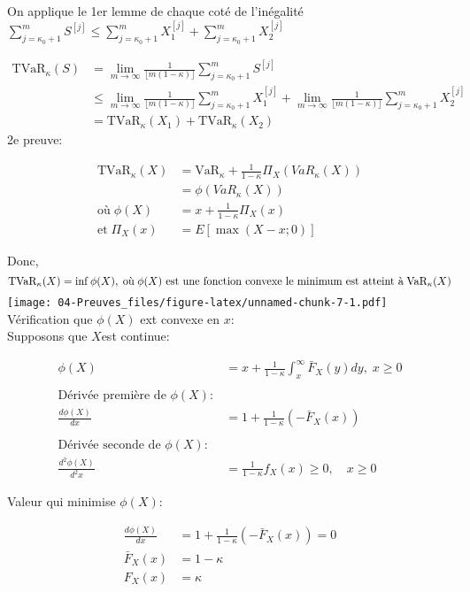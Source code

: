 \documentclass[]{book}
\theoremstyle{definition}
\theoremstyle{definition}
\theoremstyle{definition}
\theoremstyle{remark}
\begin{document}
On applique le 1er lemme de chaque coté de l'inégalité\\
\(\sum^m_{j=\kappa_0 +1} S^{[j]}\le\sum^m_{j=\kappa_0 +1} X_1^{[j]}+\sum^m_{j=\kappa_0 +1} X_2^{[j]}\)

\begin{align*}
\text{TVaR}_\kappa(S)& = \lim_{m\to\infty}\frac{1}{\lfloor m(1-\kappa)\rfloor} \sum^m_{j=\kappa_0 +1} S^{[j]}\\
& \le \lim_{m\to\infty}\frac{1}{\lfloor m(1-\kappa)\rfloor} \sum^m_{j=\kappa_0 +1} X_1^{[j]} + \lim_{m\to\infty}\frac{1}{\lfloor m(1-\kappa)\rfloor} \sum^m_{j=\kappa_0 +1} X_2^{[j]}\\
& =\text{TVaR}_\kappa(X_1)+\text{TVaR}_\kappa(X_2)
\end{align*}
 2e preuve:

\begin{align*}
\text{TVaR}_\kappa(X)& =\text{VaR}_\kappa+\frac{1}{1-\kappa}\Pi_X(VaR_\kappa(X))\\
& =\phi(VaR_\kappa(X))\\
\text{où}\;\phi(X)& =x + \frac{1}{1-\kappa}\Pi_X(x)\\
\text{et}\; \Pi_X(x)& = E\left[\max(X-x;0)\right]
\end{align*}

Donc, \[
\text{TVaR}_\kappa(X)= \inf \phi(X),\; \text{où}\;\phi(X) \text{ est une fonction convexe}   
\\
\text{ le minimum est atteint à}\; \text{VaR}_\kappa(X)
\] \texttt{[image: 04-Preuves\_files/figure-latex/unnamed-chunk-7-1.pdf]}
Vérification que \(\phi(X)\) ext convexe en \(x\):\\
Supposons que \(X\)est continue:

\begin{align*}
\phi(X)& =x + \frac{1}{1-\kappa} \int^{\infty}_x \bar{F}_X(y)dy,\;x\geq 0\\
\\
\text{Dérivée première de }\phi(X):\\
\frac{d\phi(X)}{dx}& =1+\frac{1}{1-\kappa}(-\bar{F}_X(x))\\
\\
\text{Dérivée seconde de }\phi(X):\\
\frac{d^2\phi(X)}{d^2x}& =\frac{1}{1-\kappa}f_X(x)\geq 0,\quad x\geq 0
\end{align*}

Valeur qui minimise \(\phi(X)\):

\begin{align*}
\frac{d\phi(X)}{dx}& = 1+\frac{1}{1-\kappa}(-\bar{F}_X(x))=0\\
\bar{F}_X(x)& =1-\kappa\\
F_X(x)& =\kappa
\end{align*}
\end{document}
